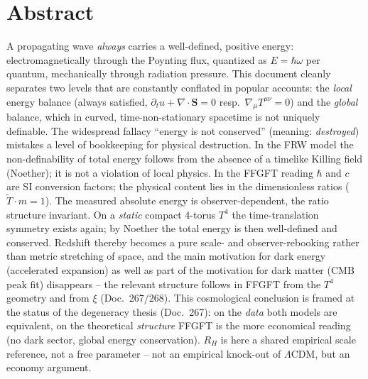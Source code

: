 
\newtheorem{warnthm}[theorem]{Warning}

\section*{Abstract}
A propagating wave \emph{always} carries a well-defined, positive energy:
electromagnetically through the Poynting flux, quantized as $E=\hbar\omega$ per
quantum, mechanically through radiation pressure. This document cleanly
separates two levels that are constantly conflated in popular accounts: the
\emph{local} energy balance (always satisfied,
$\partial_t u + \nabla\!\cdot\mathbf S = 0$ resp.\
$\nabla_\mu T^{\mu\nu}=0$) and the \emph{global} balance, which in curved,
time-non-stationary spacetime is not uniquely definable. The widespread
fallacy \enquote{energy is not conserved} (meaning: \emph{destroyed})
mistakes a level of bookkeeping for physical destruction. In the FRW model the
non-definability of total energy follows from the absence of a timelike
Killing field (Noether); it is not a violation of local physics. In the FFGFT
reading $\hbar$ and $c$ are SI conversion factors; the physical content lies in
the dimensionless ratios ($\tilde T\cdot m = 1$). The measured absolute energy
is observer-dependent, the ratio structure invariant. On a \emph{static}
compact 4-torus $T^4$ the time-translation symmetry exists again; by Noether
the total energy is then well-defined and conserved. Redshift thereby becomes a
pure scale- and observer-rebooking rather than metric stretching of space, and
the main motivation for dark energy (accelerated expansion) as well as part of
the motivation for dark matter (CMB peak fit) disappears -- the relevant
structure follows in FFGFT from the $T^4$ geometry and from $\xi$ (Doc.~267/268).
This cosmological conclusion is framed at the status of the degeneracy thesis
(Doc.~267): on the \emph{data} both models are equivalent, on the theoretical
\emph{structure} FFGFT is the more economical reading (no dark sector, global
energy conservation). $R_H$ is here a shared empirical scale reference, not a
free parameter -- not an empirical knock-out of $\Lambda$CDM, but an economy
argument.

